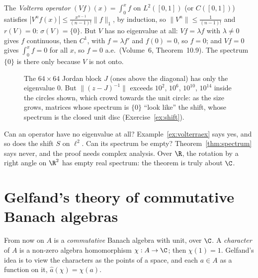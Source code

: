\begin{example}\label{ex:volterraex}
The \emph{Volterra operator} $(Vf)(x)=\int_0^xf$ on $L^2([0,1])$ (or $C([0,1])$) satisfies $|V^nf(x)|\le\frac{x^{n-1}}{(n-1)!}\|f\|_1$, by induction, so $\|V^n\|\le\frac1{(n-1)!}$ and $r(V)=0$: $\sigma(V)=\{0\}$. But $V$ has no eigenvalue at
all: $Vf=\lambda f$ with $\lambda\ne0$ gives $f$ continuous, then $C^1$, with $f=\lambda f'$ and $f(0)=0$, so $f=0$; and $Vf=0$ gives $\int_0^xf=0$ for all $x$, so $f=0$ a.e.\ (Volume~6, Theorem~10.9). The spectrum $\{0\}$ is
there only because $V$ is not onto.
\end{example}

\begin{figure}[ht]
\centering
{}
\caption{The $64\times64$ Jordan block $J$ (ones above the diagonal) has only the eigenvalue $0$. But $\|(z-J)^{-1}\|$ exceeds $10^{2}$, $10^{6}$, $10^{10}$, $10^{14}$ inside the circles shown, which crowd towards the unit circle: as the
size grows, matrices whose spectrum is $\{0\}$ ``look like'' the shift, whose spectrum is the closed unit disc (Exercise~\ref{ex:shift}).}
\label{fig:pseudospectra}
\end{figure}

\begin{think}
Can an operator have no eigenvalue at all? Example~\ref{ex:volterraex} says yes, and so does the shift $S$ on $\ell^2$. Can its spectrum be empty? Theorem~\ref{thm:spectrum} says never, and the proof needs complex analysis. Over $\R$,
the rotation by a right angle on $\R^2$ has empty real spectrum: the theorem is truly about $\C$.
\end{think}

\section{Gelfand's theory of commutative Banach algebras}

From now on $A$ is a \emph{commutative} Banach algebra with unit, over $\C$. A \emph{character} of $A$ is a non-zero algebra homomorphism $\chi:A\to\C$; then $\chi(1)=1$. Gelfand's idea is to view the characters as the points of a space, and
each $a\in A$ as a function on it, $\hat a(\chi)=\chi(a)$.

